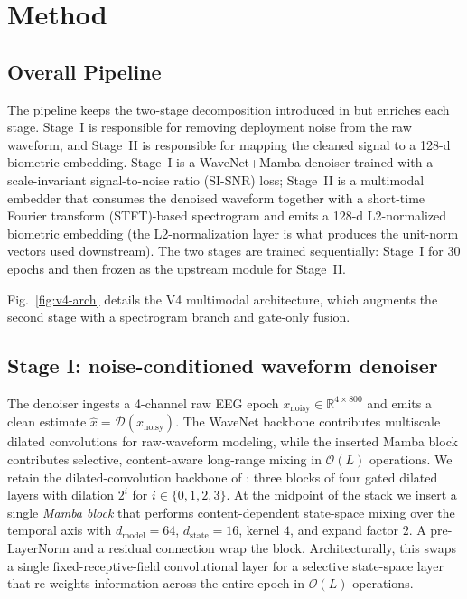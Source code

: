 \documentclass[conference,a4paper]{APSIPA2026}
\begin{document}
\section{Method}
\subsection{Overall Pipeline}
The pipeline keeps the two-stage decomposition introduced in
\cite{vu2026aisei} but enriches each stage. Stage~I is responsible for
removing deployment noise from the raw waveform, and Stage~II is
responsible for mapping the cleaned signal to a 128-d biometric
embedding. Stage~I is a WaveNet+Mamba denoiser trained with a
scale-invariant signal-to-noise ratio (SI-SNR) loss; Stage~II is a
multimodal embedder that consumes the denoised waveform together with a
short-time Fourier transform (STFT)-based spectrogram and emits a
128-d L2-normalized biometric embedding (the L2-normalization layer
is what produces the unit-norm vectors used downstream). The two stages are trained
sequentially: Stage~I for $30$ epochs and then frozen as the upstream
module for Stage~II.

Fig.~\ref{fig:v4-arch} details the V4 multimodal architecture, which
augments the second stage with a spectrogram branch and gate-only
fusion.

\subsection{Stage I: noise-conditioned waveform denoiser}
The denoiser ingests a 4-channel raw EEG epoch
$x_{\mathrm{noisy}}\in\mathbb{R}^{4\times 800}$ and emits a clean estimate
$\hat{x}=\mathcal{D}(x_{\mathrm{noisy}})$. The WaveNet backbone
contributes multiscale dilated convolutions for raw-waveform modeling,
while the inserted Mamba block contributes selective, content-aware
long-range mixing in $\mathcal{O}(L)$ operations. We retain the
dilated-convolution backbone of
\cite{vandenoord2016wavenet,luo2019tasnet}: three blocks of four
gated dilated layers with dilation $2^{i}$ for $i\in\{0,1,2,3\}$. At the
midpoint of the stack we insert a single \emph{Mamba block} that performs
content-dependent state-space mixing over the temporal axis with
$d_{\mathrm{model}}=64$, $d_{\mathrm{state}}=16$, kernel $4$, and
expand factor $2$. A pre-LayerNorm and a residual connection wrap the
block. Architecturally, this swaps a single fixed-receptive-field
convolutional layer for a selective state-space layer that re-weights
information across the entire epoch in $\mathcal{O}(L)$ operations.
\end{document}
